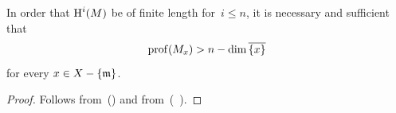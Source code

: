 \begin{corollary} \label{V.3.6} In order that $\operatorname{H}^{i}(M)$ be of finite length for~$i\leq n$, it is necessary and sufficient that
\[
\operatorname{prof}(M_x)>n-\dim\overline{\{ x\} }\]
for every $x\in X-\{ \mathfrak{m}\}$.
\end{corollary}

\begin{proof}
Follows from~() and from~(~).
\skipqed
\end{proof}
